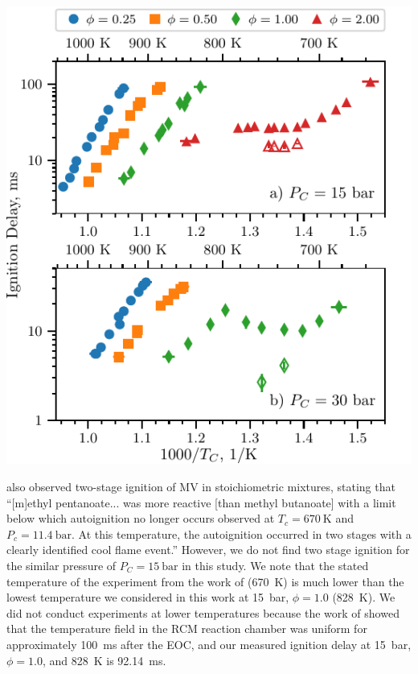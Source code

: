 \documentclass[letterpaper, review]{elsarticle}
\begin{document}
\begin{center}
    \captionsetup{type=figure}
    \includegraphics{figures/ignition-delays.pdf}
    \caption{Ignition delays of MV as a function of inverse temperature. Filled
    points are the overall ignition delays and hollow points are the first stage
    ignition delays. a) \SI{15}{\bar}. b) \SI{30}{\bar}}
    \label{fig:ignition-delays}
\end{center}

\citet{Hadj-Ali2009} also observed two-stage ignition of MV in stoichiometric mixtures, stating that
``[m]ethyl pentanoate... was more reactive [than methyl butanoate] with a limit below which
autoignition no longer occurs observed at \(T_c = \SI{670}{\K}\) and \(P_c = \SI{11.4}{\bar}\). At
this temperature, the autoignition occurred in two stages with a clearly identified cool flame
event.''\cite{Hadj-Ali2009} However, we do not find two stage ignition for the similar pressure of
\(P_C = \SI{15}{\bar}\) in this study. We note that the stated temperature of the experiment from
the work of \citet{Hadj-Ali2009} (\SI{670}{\K}) is much lower than the lowest temperature we
considered in this work at \SI{15}{\bar}, \(\phi=1.0\) (\SI{828}{\K}). We did not conduct
experiments at lower temperatures because the work of \citet{Mittal2006} showed that the temperature
field in the RCM reaction chamber was uniform for approximately \SI{100}{\ms} after the EOC, and our
measured ignition delay at \SI{15}{\bar}, \(\phi=1.0\), and \SI{828}{\K} is \SI{92.14}{\ms}.
\end{document}
